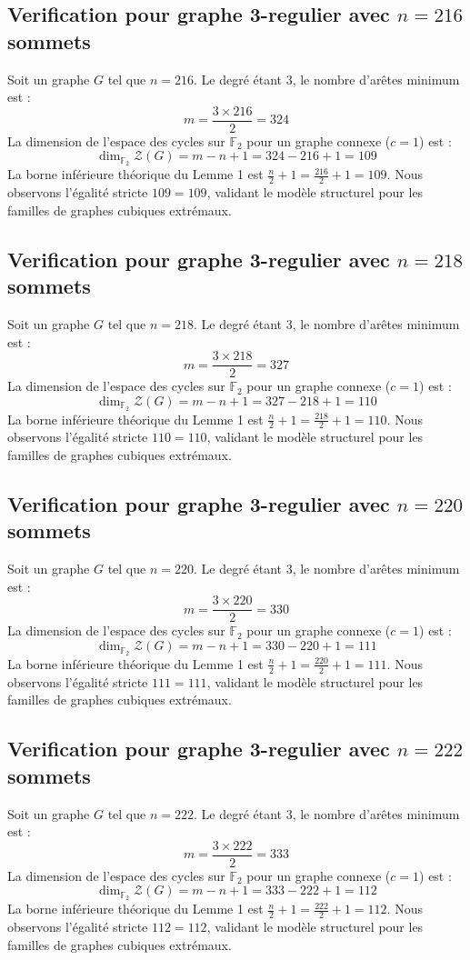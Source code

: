 \documentclass[11pt,a4paper]{article}
\begin{document}
\subsection{Verification pour graphe 3-regulier avec $n=216$ sommets}
Soit un graphe $G$ tel que $n = 216$. Le degré étant 3, le nombre d'arêtes minimum est :
$$ m = \frac{3 \times 216}{2} = 324 $$
La dimension de l'espace des cycles sur $\mathbb{F}_2$ pour un graphe connexe ($c=1$) est :
$$ \dim_{\mathbb{F}_2} \mathcal{Z}(G) = m - n + 1 = 324 - 216 + 1 = 109 $$
La borne inférieure théorique du Lemme 1 est $\frac{n}{2} + 1 = \frac{216}{2} + 1 = 109$.
Nous observons l'égalité stricte $109 = 109$, validant le modèle structurel pour les familles de graphes cubiques extrémaux.

\subsection{Verification pour graphe 3-regulier avec $n=218$ sommets}
Soit un graphe $G$ tel que $n = 218$. Le degré étant 3, le nombre d'arêtes minimum est :
$$ m = \frac{3 \times 218}{2} = 327 $$
La dimension de l'espace des cycles sur $\mathbb{F}_2$ pour un graphe connexe ($c=1$) est :
$$ \dim_{\mathbb{F}_2} \mathcal{Z}(G) = m - n + 1 = 327 - 218 + 1 = 110 $$
La borne inférieure théorique du Lemme 1 est $\frac{n}{2} + 1 = \frac{218}{2} + 1 = 110$.
Nous observons l'égalité stricte $110 = 110$, validant le modèle structurel pour les familles de graphes cubiques extrémaux.

\subsection{Verification pour graphe 3-regulier avec $n=220$ sommets}
Soit un graphe $G$ tel que $n = 220$. Le degré étant 3, le nombre d'arêtes minimum est :
$$ m = \frac{3 \times 220}{2} = 330 $$
La dimension de l'espace des cycles sur $\mathbb{F}_2$ pour un graphe connexe ($c=1$) est :
$$ \dim_{\mathbb{F}_2} \mathcal{Z}(G) = m - n + 1 = 330 - 220 + 1 = 111 $$
La borne inférieure théorique du Lemme 1 est $\frac{n}{2} + 1 = \frac{220}{2} + 1 = 111$.
Nous observons l'égalité stricte $111 = 111$, validant le modèle structurel pour les familles de graphes cubiques extrémaux.

\subsection{Verification pour graphe 3-regulier avec $n=222$ sommets}
Soit un graphe $G$ tel que $n = 222$. Le degré étant 3, le nombre d'arêtes minimum est :
$$ m = \frac{3 \times 222}{2} = 333 $$
La dimension de l'espace des cycles sur $\mathbb{F}_2$ pour un graphe connexe ($c=1$) est :
$$ \dim_{\mathbb{F}_2} \mathcal{Z}(G) = m - n + 1 = 333 - 222 + 1 = 112 $$
La borne inférieure théorique du Lemme 1 est $\frac{n}{2} + 1 = \frac{222}{2} + 1 = 112$.
Nous observons l'égalité stricte $112 = 112$, validant le modèle structurel pour les familles de graphes cubiques extrémaux.
\end{document}
